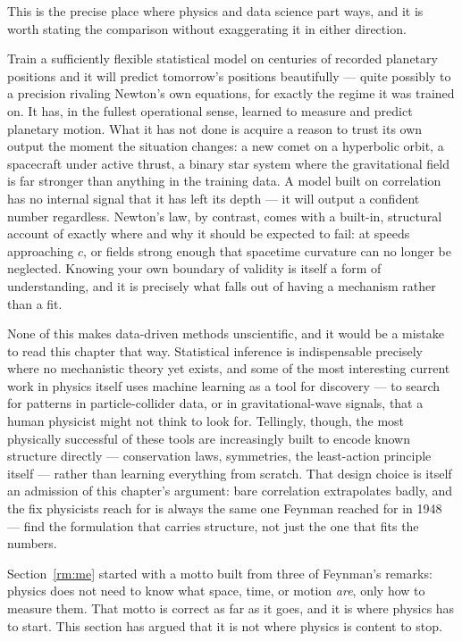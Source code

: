 This is the precise place where physics and data science part ways, and it is
worth stating the comparison without exaggerating it in either direction.

Train a sufficiently flexible statistical model on centuries of recorded
planetary positions and it will predict tomorrow's positions beautifully ---
quite possibly to a precision rivaling Newton's own equations, for exactly the
regime it was trained on. It has, in the fullest operational sense, learned to
measure and predict planetary motion. What it has not done is acquire a reason
to trust its own output the moment the situation changes: a new comet on a
hyperbolic orbit, a spacecraft under active thrust, a binary star system where
the gravitational field is far stronger than anything in the training data. A
model built on correlation has no internal signal that it has left its depth
--- it will output a confident number regardless. Newton's law, by contrast,
comes with a built-in, structural account of exactly where and why it should be
expected to fail: at speeds approaching $c$, or fields strong enough that
spacetime curvature can no longer be neglected. Knowing your own boundary of
validity is itself a form of understanding, and it is precisely what falls out
of having a mechanism rather than a fit.

None of this makes data-driven methods unscientific, and it would be a mistake
to read this chapter that way. Statistical inference is indispensable precisely
where no mechanistic theory yet exists, and some of the most interesting
current work in physics itself uses machine learning as a tool for discovery
--- to search for patterns in particle-collider data, or in gravitational-wave
signals, that a human physicist might not think to look for. Tellingly, though,
the most physically successful of these tools are increasingly built to encode
known structure directly --- conservation laws, symmetries, the least-action
principle itself --- rather than learning everything from scratch. That design
choice is itself an admission of this chapter's argument: bare correlation
extrapolates badly, and the fix physicists reach for is always the same one
Feynman reached for in 1948 --- find the formulation that carries structure,
not just the one that fits the numbers.


Section~\ref{rm:me} started with a motto built from three of
Feynman's remarks: physics
does not need to know what space, time, or motion \emph{are}, only how to
measure them. That motto is correct as far as it goes, and it is where physics
has to start. This section has argued that it is not where physics is content
to stop.

